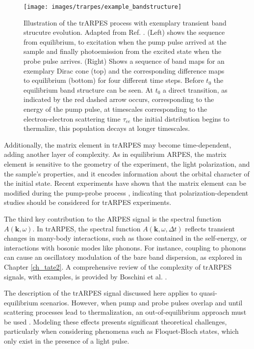 \begin{figure}
	\centering
	\texttt{[image: images/trarpes/example\_bandstructure]}
	\caption{Illustration of the trARPES process with exemplary transient band strucutre evolution. Adapted from Ref. \cite{boschini_time-resolved_2024}. (Left) shows the sequence from equilibrium, to excitation when the pump pulse arrived at the sample and finally photoemission from the excited state when the probe pulse arrives. (Right) Shows a sequence of band maps for an exemplary Dirac cone (top) and the corresponding difference maps to equilibrium (bottom) for four different time steps. Before $t_0$ the equilibrium band structure can be seen. At $t_0$ a direct transition, as indicated by the red dashed arrow occurs, corresponding to the energy of the pump pulse, at timescales corresponding to the electron-electron scattering time $\tau_{ee}$ the initial distribution begins to thermalize, this population decays at longer timescales.}
	\label{fig:example_bandstructure}
\end{figure}

Additionally, the matrix element in trARPES may become time-dependent, adding another layer of complexity.
As in equilibrium ARPES, the matrix element is sensitive to the geometry of the experiment, the light polarization, and the sample's properties, and it encodes information about the orbital character of the initial state.
Recent experiments have shown that the matrix element can be modified during the pump-probe process \cite{boschini_role_2020,freericks_constant_2016}, indicating that polarization-dependent studies should be considered for trARPES experiments.

The third key contribution to the ARPES signal is the spectral function $A(\mathbf{k}, \omega)$.
In trARPES, the spectral function $A(\mathbf{k}, \omega, \Delta t)$ reflects transient changes in many-body interactions, such as those contained in the self-energy, or interactions with bosonic modes like phonons.
For instance, coupling to phonons can cause an oscillatory modulation of the bare band dispersion, as explored in Chapter \ref{ch_tate2}.
A comprehensive review of the complexity of trARPES signals, with examples, is provided by Boschini et al. \cite{boschini_time-resolved_2024}.

The description of the trARPES signal discussed here applies to quasi-equilibrium scenarios.
However, when pump and probe pulses overlap and until scattering processes lead to thermalization, an out-of-equilibrium approach must be used \cite{schuler_theory_2021, freericks_what_2021, neufeld_time-_2022}.
Modeling these effects presents significant theoretical challenges, particularly when considering phenomena such as Floquet-Bloch states, which only exist in the presence of a light pulse.

